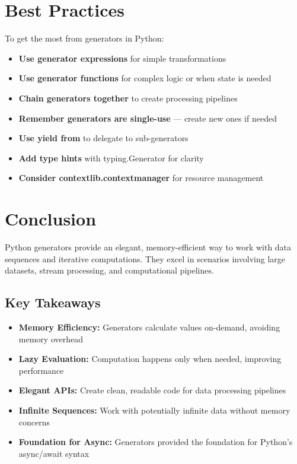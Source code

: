 \documentclass[12pt,letterpaper]{article}
\begin{document}
\section{Best Practices}

To get the most from generators in Python:

\begin{itemize}
    \item \textbf{\textcolor{pythonBlue}{Use generator expressions}} for simple transformations
    \item \textbf{\textcolor{pythonBlue}{Use generator functions}} for complex logic or when state is needed
    \item \textbf{\textcolor{pythonBlue}{Chain generators together}} to create processing pipelines
    \item \textbf{\textcolor{pythonBlue}{Remember generators are single-use}} — create new ones if needed
    \item \textbf{\textcolor{pythonBlue}{Use yield from}} to delegate to sub-generators
    \item \textbf{\textcolor{pythonBlue}{Add type hints}} with typing.Generator for clarity
    \item \textbf{\textcolor{pythonBlue}{Consider contextlib.contextmanager}} for resource management
\end{itemize}

\section{Conclusion}

Python generators provide an elegant, memory-efficient way to work with data sequences and iterative computations. They excel in scenarios involving large datasets, stream processing, and computational pipelines.

\subsection{Key Takeaways}

\begin{itemize}
    \item \textbf{\textcolor{pythonBlue}{Memory Efficiency:}} Generators calculate values on-demand, avoiding memory overhead
    \item \textbf{\textcolor{pythonBlue}{Lazy Evaluation:}} Computation happens only when needed, improving performance
    \item \textbf{\textcolor{pythonBlue}{Elegant APIs:}} Create clean, readable code for data processing pipelines
    \item \textbf{\textcolor{pythonBlue}{Infinite Sequences:}} Work with potentially infinite data without memory concerns
    \item \textbf{\textcolor{pythonBlue}{Foundation for Async:}} Generators provided the foundation for Python's async/await syntax
\end{itemize}
\end{document}
